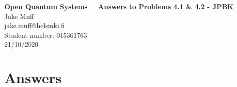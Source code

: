 \documentclass[12pt]{article}
\begin{document}
\normalsize

\baselineskip 14pt

\begin{center}
{\Large {\bf Open Quantum Systems \ \  Answers to Problems 4.1 \& 4.2 - JPBK }}\\
{\large { Jake Muff}}\\
jake.muff@helsinki.fi \\
{Student number: 015361763}\\
{21/10/2020}
\end{center}


\section{Answers}
\begin{enumerate}


\end{enumerate}
\end{document}
